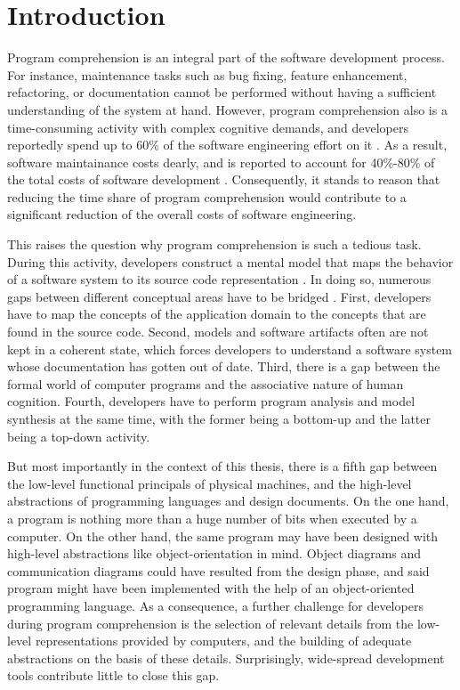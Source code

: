 \chapter{Introduction}
\label{c:introduction}
Program comprehension is an integral part of the software development process.
For instance, maintenance tasks such as bug fixing, feature enhancement, refactoring, or documentation cannot be performed without having a sufficient understanding of the system at hand.
However, program comprehension also is a time-consuming activity with complex cognitive demands, and developers reportedly spend up to 60\% of the software engineering effort on it \cite{corbi_program_1989, basili_evolving_1997, ducasse_class_2005, rothlisberger_feature_2007, cornelissen_execution_2008}.
As a result, software maintainance costs dearly, and is reported to account for 40\%-80\% of the total costs of software development \cite{glass_frequently_2001}.
Consequently, it stands to reason that reducing the time share of program comprehension would contribute to a significant reduction of the overall costs of software engineering.

This raises the question why program comprehension is such a tedious task.
During this activity, developers construct a mental model that maps the behavior of a software system to its source code representation \cite{latoza_maintaining_2006}.
In doing so, numerous gaps between different conceptual areas have to be bridged \cite{kent_program_1996}.
First, developers have to map the concepts of the application domain to the concepts that are found in the source code.
Second, models and software artifacts often are not kept in a coherent state, which forces developers to understand a software system whose documentation has gotten out of date.
Third, there is a gap between the formal world of computer programs and the associative nature of human cognition.
Fourth, developers have to perform program analysis and model synthesis at the same time, with the former being a bottom-up and the latter being a top-down activity.

But most importantly in the context of this thesis, there is a fifth gap between the low-level functional principals of physical machines, and the high-level abstractions of programming languages and design documents.
On the one hand, a program is nothing more than a huge number of bits when executed by a computer.
On the other hand, the same program may have been designed with high-level abstractions like object-orientation in mind.
Object diagrams and communication diagrams could have resulted from the design phase, and said program might have been implemented with the help of an object-oriented programming language.
As a consequence, a further challenge for developers during program comprehension is the selection of relevant details from the low-level representations provided by computers, and the building of adequate abstractions on the basis of these details.
Surprisingly, wide-spread development tools contribute little to close this gap.

